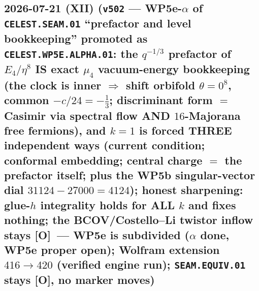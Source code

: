 \documentclass[11pt]{article}
\providecommand{\mO}{\textbf{[O]}}\providecommand{\mX}{\textbf{[X]}}
\begin{document}
\subsection*{2026-07-21 (XII) (\texttt{v502} --- WP5e-$\alpha$ of \texttt{CELEST.SEAM.01} ``prefactor and level bookkeeping'' promoted as \texttt{CELEST.WP5E.ALPHA.01}: the $q^{-1/3}$ prefactor of $E_4/\eta^8$ IS exact $\mu_4$ vacuum-energy bookkeeping (the clock is inner $\Rightarrow$ shift orbifold $\theta=0^8$, common $-c/24=-\tfrac13$; discriminant form $=$ Casimir via spectral flow AND $16$-Majorana free fermions), and $k=1$ is forced THREE independent ways (current condition; conformal embedding; central charge $=$ the prefactor itself; plus the WP5b singular-vector dial $31124-27000=4124$); honest sharpening: glue-$h$ integrality holds for ALL $k$ and fixes nothing; the BCOV/Costello--Li twistor inflow stays \mO\ --- WP5e is subdivided ($\alpha$ done, WP5e proper open); Wolfram extension $416\to420$ (verified engine run); \texttt{SEAM.EQUIV.01} stays \mO, no marker moves)}
\end{document}
